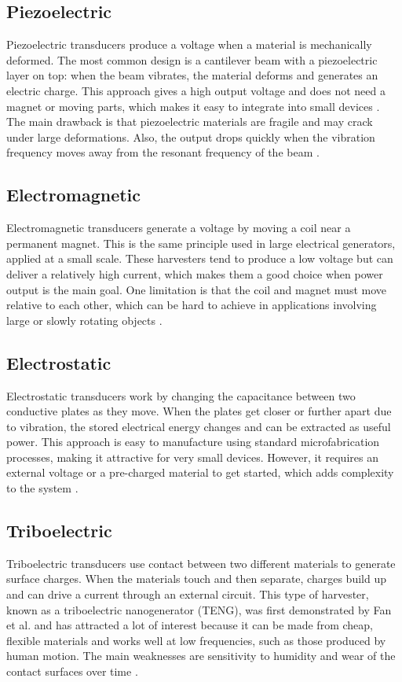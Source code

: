 \subsection*{Piezoelectric}
Piezoelectric transducers produce a voltage when a 
material is mechanically deformed. The most common design
is a cantilever beam with a piezoelectric layer on top:
when the beam vibrates, the material deforms and
generates an electric charge. This approach gives a
high output voltage and does not need a magnet or
moving parts, which makes it easy to integrate into small 
devices \cite{antonReviewPowerHarvesting2007}. The main drawback is that
piezoelectric materials are fragile and may crack under
large deformations. Also, the output drops quickly
when the vibration frequency moves away from the 
resonant frequency of the 
beam \cite{roundyStudyLowLevel2003a}.


\subsection*{Electromagnetic}
Electromagnetic transducers generate a voltage by
moving a coil near a permanent magnet. This is the
same principle used in large electrical generators,
applied at a small scale. These harvesters tend to
produce a low voltage but can deliver a relatively
high current, which makes them a good choice when
power output is the main goal.
One limitation is that the coil and magnet must move
relative to each other, which can be hard to achieve
in applications involving large or slowly rotating
objects \cite{mitchesonEnergyHarvestingHuman2008}.

\subsection*{Electrostatic}
Electrostatic transducers work by changing the
capacitance between two conductive plates as they
move. When the plates get closer or further apart
due to vibration, the stored electrical energy
changes and can be extracted as useful power.
This approach is easy to manufacture using standard
microfabrication processes, making it attractive for
very small devices. However, it requires an external
voltage or a pre-charged material to get started,
which adds complexity to the
system \cite{mitchesonEnergyHarvestingHuman2008, beebyEnergyHarvestingVibration2006}.

\subsection*{Triboelectric}
Triboelectric transducers use contact between two
different materials to generate surface charges.
When the materials touch and then separate, charges
build up and can drive a current through an external
circuit. This type of harvester, known as a
triboelectric nanogenerator (TENG), was first
demonstrated by Fan et al.\cite{fanFlexibleTriboelectricGenerator2012} and
has attracted a lot of interest because it can be
made from cheap, flexible materials and works well
at low frequencies, such as those produced by human
motion. The main weaknesses are sensitivity to
humidity and wear of the contact surfaces over
time \cite{leonavilaEnergyHarvestingTechniques2025}.


